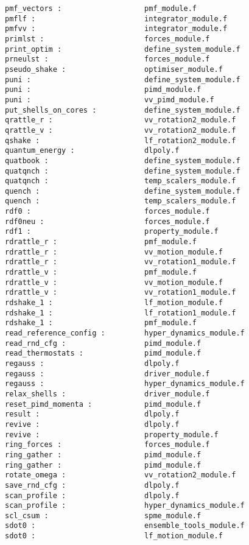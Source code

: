 \begin{verbatim}
pmf_vectors :                   pmf_module.f
pmflf :                         integrator_module.f
pmfvv :                         integrator_module.f
primlst :                       forces_module.f
print_optim :                   define_system_module.f
prneulst :                      forces_module.f
pseudo_shake :                  optimiser_module.f
puni :                          define_system_module.f 
puni :                          pimd_module.f 
puni :                          vv_pimd_module.f 
put_shells_on_cores :           define_system_module.f
qrattle_r :                     vv_rotation2_module.f
qrattle_v :                     vv_rotation2_module.f
qshake :                        lf_rotation2_module.f
quantum_energy :                dlpoly.f
quatbook :                      define_system_module.f
quatqnch :                      define_system_module.f
quatqnch :                      temp_scalers_module.f
quench :                        define_system_module.f
quench :                        temp_scalers_module.f
rdf0 :                          forces_module.f
rdf0neu :                       forces_module.f
rdf1 :                          property_module.f
rdrattle_r :                    pmf_module.f
rdrattle_r :                    vv_motion_module.f
rdrattle_r :                    vv_rotation1_module.f
rdrattle_v :                    pmf_module.f
rdrattle_v :                    vv_motion_module.f
rdrattle_v :                    vv_rotation1_module.f
rdshake_1 :                     lf_motion_module.f
rdshake_1 :                     lf_rotation1_module.f
rdshake_1 :                     pmf_module.f
read_reference_config :         hyper_dynamics_module.f
read_rnd_cfg :                  pimd_module.f
read_thermostats :              pimd_module.f
regauss :                       dlpoly.f
regauss :                       driver_module.f
regauss :                       hyper_dynamics_module.f
relax_shells :                  driver_module.f
reset_pimd_momenta :            pimd_module.f
result :                        dlpoly.f
revive :                        dlpoly.f
revive :                        property_module.f
ring_forces :                   forces_module.f
ring_gather :                   pimd_module.f
ring_gather :                   pimd_module.f
rotate_omega :                  vv_rotation2_module.f
save_rnd_cfg :                  dlpoly.f
scan_profile :                  dlpoly.f
scan_profile :                  hyper_dynamics_module.f
scl_csum :                      spme_module.f
sdot0 :                         ensemble_tools_module.f 
sdot0 :                         lf_motion_module.f 

\end{verbatim}
